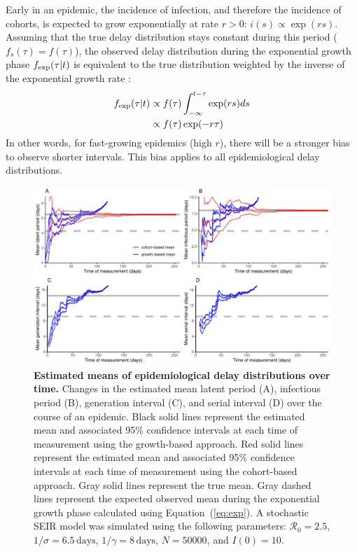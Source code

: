 \documentclass[12pt]{article}
\newcommand{\eref}[1]{(\ref{eq:#1})}
\begin{document}
Early in an epidemic, the incidence of infection, and therefore the incidence of cohorts, is expected to grow exponentially at rate $r > 0$: $i(s) \propto \exp(rs)$.
Assuming that the true delay distribution stays constant during this period ($f_s(\tau) = f(\tau)$), 
the observed delay distribution during the exponential growth phase $f_{\tiny\textrm{exp}}(\tau|t)$ is equivalent to the true distribution weighted by the inverse of the exponential growth rate \citep{britton2019estimation}:
\begin{equation}
\begin{aligned}
f_{\tiny\textrm{exp}}(\tau|t) &\propto f(\tau) \int_{-\infty}^{t-\tau} \exp(rs) ds\\
&\propto f(\tau) \exp(-r\tau) \\
\end{aligned}
\end{equation}
In other words, for fast-growing epidemics (high $r$), there will be a stronger bias to observe shorter intervals.
This bias applies to all epidemiological delay distributions.

\begin{figure}[!th]
\includegraphics[width=\textwidth]{figure_seir2.pdf}
\caption{
\textbf{Estimated means of epidemiological delay distributions over time.}
Changes in the estimated mean latent period (A), infectious period (B), generation interval (C), and serial interval (D) over the course of an epidemic.
Black solid lines represent the estimated mean and associated 95\% confidence intervals at each time of measurement using the growth-based approach.
Red solid lines represent the estimated mean and associated 95\% confidence intervals at each time of measurement using the cohort-based approach.
Gray solid lines represent the true mean.
Gray dashed lines represent the expected observed mean during the exponential growth phase calculated using Equation~\eref{exp}.
A stochastic SEIR model was simulated using the following parameters: $\mathcal R_0 = 2.5$, $1/\sigma = 6.5\,\textrm{days}$, $1/\gamma = 8\,\textrm{days}$, $N=50000$, and $I(0)=10$.
}
\label{fig:seir2}
\end{figure}
\end{document}
